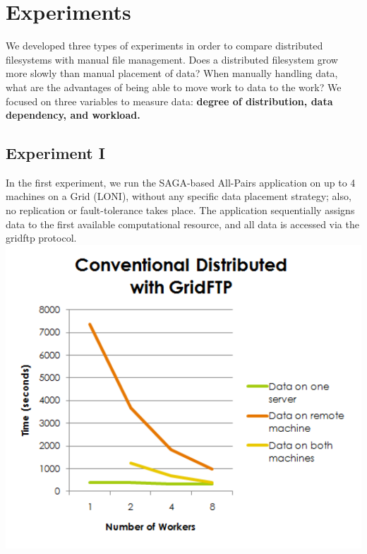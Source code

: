 \documentclass{rspublic}
\begin{document}
\section{Experiments} We developed three types of experiments
in order to compare distributed filesystems with manual file management.
Does a distributed filesystem grow more slowly than manual placement of
data?  When manually handling data, what are the advantages of being able
to move work to data to the work?  We focused on three variables to 
measure data:  \bf{degree of distribution, data dependency, and
workload.}

\subsection{Experiment I} In the first experiment, we run the SAGA-based
All-Pairs application on up to 4 machines on a Grid (LONI), without any
specific data placement strategy; also, no replication or
fault-tolerance takes place. The application sequentially assigns data
to the first available computational resource, and all data is accessed
via the gridftp protocol.
\includegraphics[width=\textwidth]{ConventionalDistributed.pdf}
\end{document}
